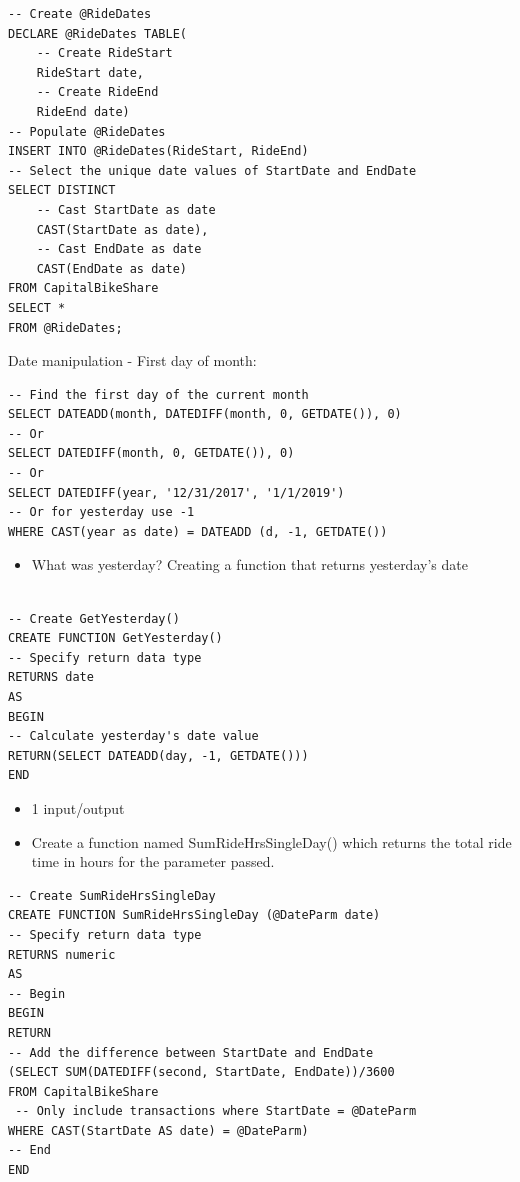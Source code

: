 \documentclass[]{book}
\providecommand{\tightlist}{%
  \setlength{\itemsep}{0pt}\setlength{\parskip}{0pt}}
\begin{document}
\begin{verbatim}
-- Create @RideDates
DECLARE @RideDates TABLE(
    -- Create RideStart
	RideStart date,
    -- Create RideEnd
	RideEnd date)
-- Populate @RideDates
INSERT INTO @RideDates(RideStart, RideEnd)
-- Select the unique date values of StartDate and EndDate
SELECT DISTINCT
    -- Cast StartDate as date
	CAST(StartDate as date),
    -- Cast EndDate as date
	CAST(EndDate as date) 
FROM CapitalBikeShare 
SELECT * 
FROM @RideDates;
\end{verbatim}

Date manipulation
- First day of month:

\begin{verbatim}
-- Find the first day of the current month
SELECT DATEADD(month, DATEDIFF(month, 0, GETDATE()), 0)
-- Or
SELECT DATEDIFF(month, 0, GETDATE()), 0)
-- Or
SELECT DATEDIFF(year, '12/31/2017', '1/1/2019')
-- Or for yesterday use -1
WHERE CAST(year as date) = DATEADD (d, -1, GETDATE())
\end{verbatim}

\begin{itemize}
\tightlist
\item
  What was yesterday? Creating a function that returns yesterday's date
\end{itemize}

\begin{verbatim}

-- Create GetYesterday()
CREATE FUNCTION GetYesterday()
-- Specify return data type
RETURNS date
AS
BEGIN
-- Calculate yesterday's date value
RETURN(SELECT DATEADD(day, -1, GETDATE()))
END 
\end{verbatim}

\begin{itemize}
\tightlist
\item
  1 input/output
\item
  Create a function named SumRideHrsSingleDay() which returns the total ride time in hours for the \citet{DateParm} parameter passed.
\end{itemize}

\begin{verbatim}
-- Create SumRideHrsSingleDay
CREATE FUNCTION SumRideHrsSingleDay (@DateParm date)
-- Specify return data type
RETURNS numeric
AS
-- Begin
BEGIN
RETURN
-- Add the difference between StartDate and EndDate
(SELECT SUM(DATEDIFF(second, StartDate, EndDate))/3600
FROM CapitalBikeShare
 -- Only include transactions where StartDate = @DateParm
WHERE CAST(StartDate AS date) = @DateParm)
-- End
END
\end{verbatim}
\end{document}
